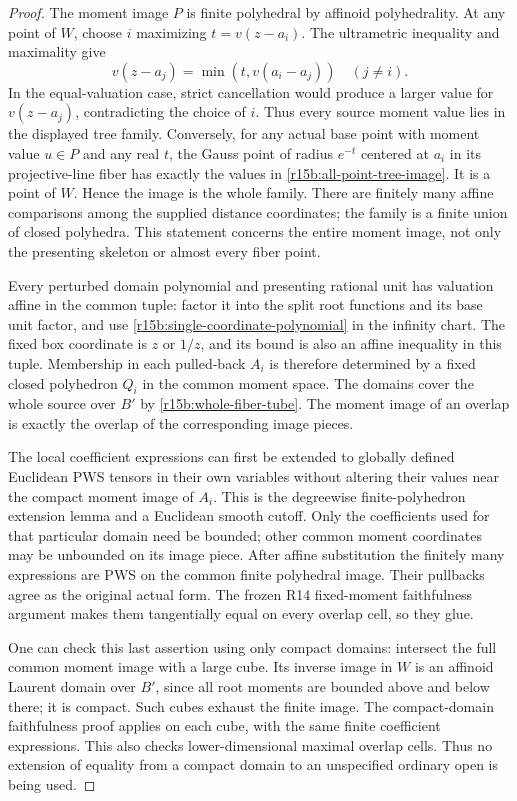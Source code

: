 \begin{proof}
The moment image $P$ is finite polyhedral by affinoid
polyhedrality. At any point of $W$, choose $i$ maximizing
$t=v(z-a_i)$. The ultrametric inequality and maximality give
\[
             v(z-a_j)=\min(t,v(a_i-a_j))
                       \quad(j\ne i).
\tag{SP15.8}\label{r15b:all-point-tree-image}
\]
In the equal-valuation case, strict cancellation would produce
a larger value for $v(z-a_j)$, contradicting the choice of $i$.
Thus every source moment value lies in the displayed tree
family. Conversely, for any actual base point with moment
value $u\in P$ and any real $t$, the Gauss point of radius
$e^{-t}$ centered at $a_i$ in its projective-line fiber has
exactly the values in \eqref{r15b:all-point-tree-image}.
It is a point of $W$. Hence the image is the whole family.
There are finitely many affine comparisons among the supplied
distance coordinates; the family is a finite union of closed
polyhedra. This statement concerns the entire moment image,
not only the presenting skeleton or almost every fiber point.

Every perturbed domain polynomial and presenting rational unit
has valuation affine in the common tuple: factor it into the
split root functions and its base unit factor, and use
\eqref{r15b:single-coordinate-polynomial} in the infinity chart.
The fixed box coordinate is $z$ or $1/z$, and its bound is
also an affine inequality in this tuple. Membership in each
pulled-back $A_i$ is therefore determined by a fixed closed
polyhedron $Q_i$ in the common moment space. The domains cover
the whole source over $B'$ by \eqref{r15b:whole-fiber-tube}.
The moment image of an overlap is exactly the overlap of the
corresponding image pieces.

The local coefficient expressions can first be extended to
globally defined Euclidean PWS tensors in their own variables
without altering their values near the compact moment image
of $A_i$. This is the degreewise finite-polyhedron extension
lemma and a Euclidean smooth cutoff. Only the coefficients
used for that particular domain need be bounded; other common
moment coordinates may be unbounded on its image piece.
After affine substitution the finitely many expressions are
PWS on the common finite polyhedral image. Their pullbacks
agree as the original actual form. The frozen R14 fixed-moment
faithfulness argument makes them tangentially equal on every
overlap cell, so they glue.

One can check this last assertion using only compact domains:
intersect the full common moment image with a large cube.
Its inverse image in $W$ is an affinoid Laurent domain over
$B'$, since all root moments are bounded above and below there;
it is compact. Such cubes exhaust the finite image. The
compact-domain faithfulness proof applies on each cube, with
the same finite coefficient expressions. This also checks
lower-dimensional maximal overlap cells. Thus no extension
of equality from a compact domain to an unspecified ordinary
open is being used.


\end{proof}
